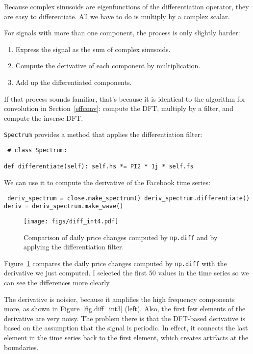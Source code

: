 \documentclass[12pt]{book} \usepackage[width=5.5in,height=8.5in, hmarginratio=3:2,vmarginratio=1:1]{geometry}
\begin{document}
Because complex sinusoids are eigenfunctions of the differentiation operator, they are easy to differentiate. All we have to do is multiply by a complex scalar. 

For signals with more than one component, the process is only slightly harder: 

\begin{enumerate} 

\item Express the signal as the sum of complex sinusoids. 

\item Compute the derivative of each component by multiplication. 

\item Add up the differentiated components. 

\end{enumerate} 

If that process sounds familiar, that's because it is identical to the algorithm for convolution in Section~\ref{effconv}: compute the DFT, multiply by a filter, and compute the inverse DFT. 

{\tt Spectrum} provides a method that applies the differentiation filter: 

\begin{verbatim} # class Spectrum: 

def differentiate(self): self.hs *= PI2 * 1j * self.fs \end{verbatim} 

We can use it to compute the derivative of the Facebook time series: 

\begin{verbatim} deriv_spectrum = close.make_spectrum() deriv_spectrum.differentiate() deriv = deriv_spectrum.make_wave() \end{verbatim} 

\begin{figure} 

\centerline{\texttt{[image: figs/diff\_int4.pdf]}} \caption{Comparison of daily price changes computed by {\tt np.diff} and by applying the differentiation filter.} \label{fig.diff_int4} \end{figure} 

Figure~\ref{fig.diff_int4} compares the daily price changes computed by {\tt np.diff} with the derivative we just computed. I selected the first 50 values in the time series so we can see the differences more clearly. 

The derivative is noisier, because it amplifies the high frequency components more, as shown in Figure~\ref{fig.diff_int3} (left). Also, the first few elements of the derivative are very noisy. The problem there is that the DFT-based derivative is based on the assumption that the signal is periodic. In effect, it connects the last element in the time series back to the first element, which creates artifacts at the boundaries. 
\end{document}
